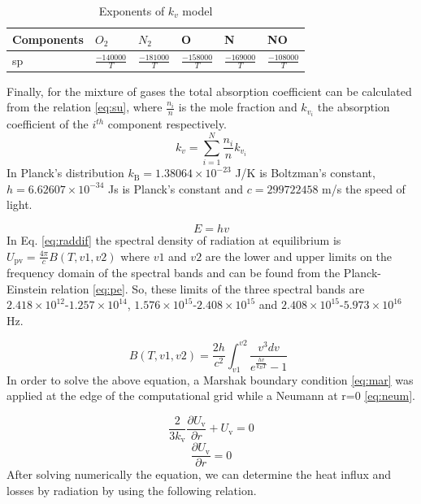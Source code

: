 \documentclass{warpdoc}
\begin{document}
\begin{table}[ht]
    \centering
    \begin{tabular} { | l | l | l | l | l | l | }
 \hline
 Components & $O_2$ & $N_2$ & O & N & NO \\
 \hline
 sp  & $\frac{-140000}{T}$  & $\frac{-181000}{T}$ & $\frac{-158000}{T}$ & $\frac{-169000}{T}$ & $\frac{-108000}{T}$  \\
\hline
\end{tabular}
    \caption{Exponents of $k_v$ model}
    \label{tab:1}
\end{table}
\noindent
Finally, for the mixture of gases the total absorption coefficient can be calculated from the relation \eqref{eq:su}, where $\frac{n_i}{n}$ is the mole fraction and $k_{v_i}$ the absorption coefficient  of the $i^{th}$ component respectively.
\begin{equation}
k_v=\sum_{i=1}^{N}\frac{n_i}{n}k_{v_i} \label{eq:su}
\end{equation}
In Planck's distribution  $k_\text{B}=1.38064\times10^{-23}$ J/K is Boltzman's constant, $h=6.62607\times10^{-34}$ Js is Planck's constant and $c=299722458$ m/s the speed of light.

\begin{equation}
    E=hv \label{eq:pe}
\end{equation}
In Eq. \eqref{eq:raddif} the spectral density of radiation at equilibrium is $U_\text{pv}=\frac{4\pi}{c}B(T,v1,v2
)$ where $v1$ and $v2$ are the lower and upper limits on the frequency domain of the spectral bands and can be found from the Planck-Einstein relation \eqref{eq:pe}. So, these limits of the three spectral bands are $2.418\times10^{12}$-$1.257\times10^{14}$, $1.576\times10^{15}$-$2.408\times10^{15}$ and $2.408\times10^{15}$-$5.973\times10^{16}$ Hz.  



\begin{equation}
    B(T,v1,v2)=\frac{2h}{c^2}\int_{v1}^{v2}\frac{v^3dv }{e^{\frac{hv}{k_B T}}-1} \enspace 
    \label{eq:bl}
\end{equation}
In order to solve the above equation,  a Marshak boundary condition \eqref{eq:mar} was applied at the edge of the computational grid while a Neumann at r=0 \eqref{eq:neum}.

\begin{equation}
    \frac{2}{3k_\text{v}}\frac{{\partial}U_\text{v}}{\partial r}+U_\text{v}=0 \label{eq:mar}
\end{equation}
\begin{equation}
    \frac{{\partial} U_\text{v}}{\partial r}=0 \label{eq:neum}
\end{equation}
After solving numerically the equation, we can determine the heat influx and losses by radiation by using the following relation.
\end{document}
